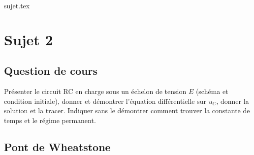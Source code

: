\documentclass[a4paper, 11pt]{book}
\begin{document}
\resetQ

{sujet.tex}

\resetQ
\newpage

\chapter{Sujet 2}
\section{Question de cours}

Présenter le circuit RC en charge sous un échelon de tension $E$ (schéma et
condition initiale), donner et démontrer l'équation différentielle sur $u_C$,
donner la solution et la tracer. Indiquer sans le démontrer comment trouver la
constante de temps et le régime permanent.

\section{Pont de Wheatstone}
\end{document}
